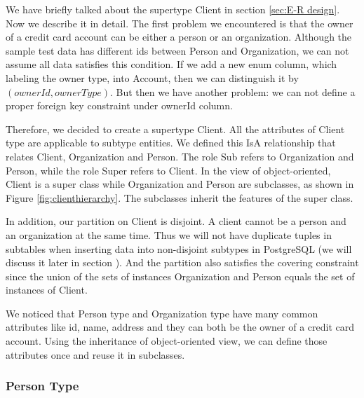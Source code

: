 \documentclass[11pt]{article}
\begin{document}
\par
We have briefly talked about the supertype Client in section \ref{sec:E-R design}. Now we describe it in detail. The first problem we encountered is that the owner of a credit card account can be either a person or an organization. Although the sample test data has different ids between Person and Organization, we can not assume all data satisfies this condition. If we add a new enum column, which labeling the owner type, into Account, then we can distinguish it by $(ownerId, ownerType)$. But then we have another problem: we can not define a proper foreign key constraint under ownerId column.

\par
Therefore, we decided to create a supertype Client. All the attributes of Client type are applicable to subtype entities. We defined this IsA relationship that relates Client, Organization and Person. The role Sub refers to Organization and Person, while the role Super refers to Client. In the view of object-oriented, Client is a super class while Organization and Person are subclasses, as shown in Figure \ref{fig:clienthierarchy}. The subclasses inherit the features of the super class.
\par
In addition, our partition on Client is disjoint. A client cannot be a person and an organization at the same time. Thus we will not have duplicate tuples in subtables when inserting data into non-disjoint subtypes in PostgreSQL (we will discuss it later in section \label{ref:ptype}). And the partition also satisfies the covering constraint since the union of the sets of instances Organization and Person equals the set of instances of Client.
\par
We noticed that Person type and Organization type have many common attributes like id, name, address and they can both be the owner of a credit card account. Using the inheritance of object-oriented view, we can define those attributes once and reuse it in subclasses.
\par


\subsubsection{Person Type}
\label{sec:ptype}
\end{document}
